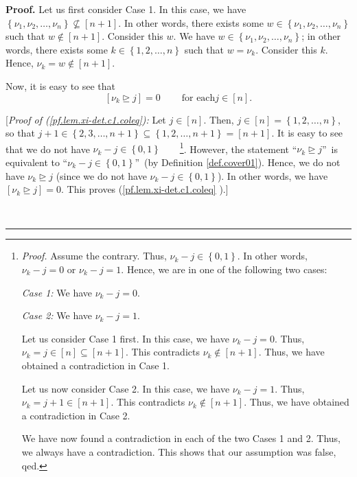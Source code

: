 \documentclass
[numbers=enddot,12pt,final,onecolumn,notitlepage,english]{scrartcl}%
\theoremstyle{definition}
\newenvironment{proof}[1][Proof]{\noindent\textbf{#1.} }{\ \rule{0.5em}{0.5em}}
\newenvironment{verlong}{}{}
\begin{document}
\begin{proof}
\begin{verlong}
Let us first consider Case 1. In this case, we have $\left\{  \nu_{1},\nu
_{2},\ldots,\nu_{n}\right\}  \not \subseteq \left[  n+1\right]  $. In other
words, there exists some $w\in\left\{  \nu_{1},\nu_{2},\ldots,\nu_{n}\right\}
$ such that $w\notin\left[  n+1\right]  $. Consider this $w$. We have
$w\in\left\{  \nu_{1},\nu_{2},\ldots,\nu_{n}\right\}  $; in other words, there
exists some $k\in\left\{  1,2,\ldots,n\right\}  $ such that $w=\nu_{k}$.
Consider this $k$. Hence, $\nu_{k}=w\notin\left[  n+1\right]  $.

Now, it is easy to see that
\begin{equation}
\left[  \nu_{k}\trianglerighteq j\right]  =0\ \ \ \ \ \ \ \ \ \ \text{for each
}j\in\left[  n\right]  . \label{pf.lem.xi-det.c1.coleq}%
\end{equation}


[\textit{Proof of (\ref{pf.lem.xi-det.c1.coleq}):} Let $j\in\left[  n\right]
$. Then, $j\in\left[  n\right]  =\left\{  1,2,\ldots,n\right\}  $, so that
$j+1\in\left\{  2,3,\ldots,n+1\right\}  \subseteq\left\{  1,2,\ldots
,n+1\right\}  =\left[  n+1\right]  $. It is easy to see that we do not have
$\nu_{k}-j\in\left\{  0,1\right\}  $\ \ \ \ \footnote{\textit{Proof.} Assume
the contrary. Thus, $\nu_{k}-j\in\left\{  0,1\right\}  $. In other words,
$\nu_{k}-j=0$ or $\nu_{k}-j=1$. Hence, we are in one of the following two
cases:
\par
\textit{Case 1:} We have $\nu_{k}-j=0$.
\par
\textit{Case 2:} We have $\nu_{k}-j=1$.
\par
Let us consider Case 1 first. In this case, we have $\nu_{k}-j=0$. Thus,
$\nu_{k}=j\in\left[  n\right]  \subseteq\left[  n+1\right]  $. This
contradicts $\nu_{k}\notin\left[  n+1\right]  $. Thus, we have obtained a
contradiction in Case 1.
\par
Let us now consider Case 2. In this case, we have $\nu_{k}-j=1$. Thus,
$\nu_{k}=j+1\in\left[  n+1\right]  $. This contradicts $\nu_{k}\notin\left[
n+1\right]  $. Thus, we have obtained a contradiction in Case 2.
\par
We have now found a contradiction in each of the two Cases 1 and 2. Thus, we
always have a contradiction. This shows that our assumption was false, qed.}.
However, the statement \textquotedblleft$\nu_{k}\trianglerighteq
j$\textquotedblright\ is equivalent to \textquotedblleft$\nu_{k}-j\in\left\{
0,1\right\}  $\textquotedblright\ (by Definition \ref{def.cover01}). Hence, we
do not have $\nu_{k}\trianglerighteq j$ (since we do not have $\nu_{k}%
-j\in\left\{  0,1\right\}  $). In other words, we have $\left[  \nu
_{k}\trianglerighteq j\right]  =0$. This proves (\ref{pf.lem.xi-det.c1.coleq}%
).] \medskip


\end{verlong}
\end{proof}
\end{document}
